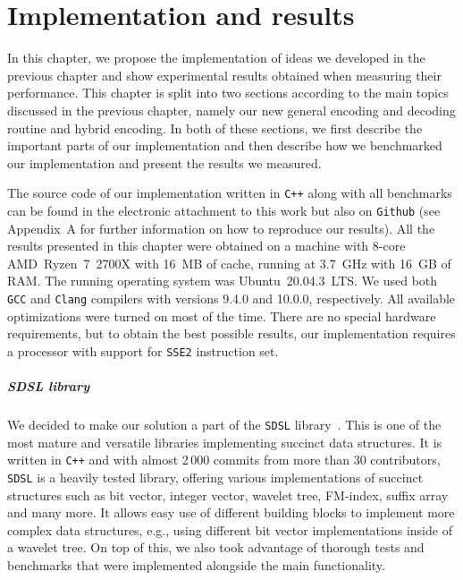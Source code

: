 \chapter{Implementation and results}
\label{kap:kap4}

In this chapter, we propose the implementation of ideas we developed in the previous
chapter and show experimental results obtained when measuring their performance.
This chapter is split into two sections according to the main topics discussed
in the previous chapter, namely our new general encoding and decoding routine and hybrid
encoding. In both of these sections, we first describe the important parts of our
implementation and then describe how we benchmarked our implementation and present the
results we measured.

The source code of our implementation written in \texttt{C++} along with all benchmarks can
be found in the electronic attachment to this work but also on \texttt{Github} (see Appendix~A
for further information on how to reproduce our results). All the results presented in this
chapter were obtained on a machine with 8-core AMD~Ryzen~7~2700X with 16~MB of cache, running
at 3.7~GHz with 16~GB of RAM. The running operating system was Ubuntu~20.04.3~LTS. We used both
\texttt{GCC} and \texttt{Clang} compilers with versions 9.4.0 and 10.0.0, respectively. All
available optimizations were turned on most of the time. There are no special hardware requirements,
but to obtain the best possible results, our implementation requires a processor with support for
\texttt{SSE2} instruction set.

\paragraph{SDSL library}

We decided to make our solution a part of the \texttt{SDSL} library~\citep{gog2014theory}. This
is one of the most mature and versatile libraries implementing succinct data structures. It is
written in \texttt{C++} and with almost 2\,000 commits from more than 30 contributors, \texttt{SDSL}
is a heavily tested library, offering various implementations of succinct structures such as
bit vector, integer vector, wavelet tree, FM-index, suffix array and many more. It allows easy use
of different building blocks to implement more complex data structures, e.g., using different bit vector
implementations inside of a wavelet tree. On top of this, we also took advantage of thorough tests
and benchmarks that were implemented alongside the main functionality.

